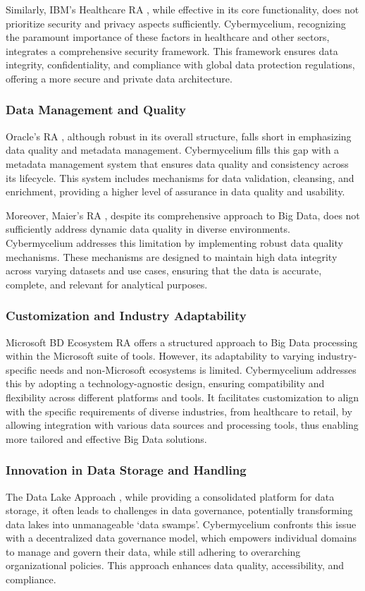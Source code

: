 \documentclass[review]{elsarticle}
\begin{document}
Similarly, IBM's Healthcare RA \cite{quintero2019ibm}, while effective in its core functionality, does not prioritize security and privacy aspects sufficiently. Cybermycelium, recognizing the paramount importance of these factors in healthcare and other sectors, integrates a comprehensive security framework. This framework ensures data integrity, confidentiality, and compliance with global data protection regulations, offering a more secure and private data architecture.

\subsubsection{Data Management and Quality}
Oracle's RA \cite{cackett2013information}, although robust in its overall structure, falls short in emphasizing data quality and metadata management. Cybermycelium fills this gap with a metadata management system that ensures data quality and consistency across its lifecycle. This system includes mechanisms for data validation, cleansing, and enrichment, providing a higher level of assurance in data quality and usability.

Moreover, Maier's RA \cite{Maier}, despite its comprehensive approach to Big Data, does not sufficiently address dynamic data quality in diverse environments. Cybermycelium addresses this limitation by implementing robust data quality mechanisms. These mechanisms are designed to maintain high data integrity across varying datasets and use cases, ensuring that the data is accurate, complete, and relevant for analytical purposes.


\subsubsection{Customization and Industry Adaptability}
Microsoft BD Ecosystem RA \cite{levin2013big} offers a structured approach to Big Data processing within the Microsoft suite of tools. However, its adaptability to varying industry-specific needs and non-Microsoft ecosystems is limited. Cybermycelium addresses this by adopting a technology-agnostic design, ensuring compatibility and flexibility across different platforms and tools. It facilitates customization to align with the specific requirements of diverse industries, from healthcare to retail, by allowing integration with various data sources and processing tools, thus enabling more tailored and effective Big Data solutions.

\subsubsection{Innovation in Data Storage and Handling}
The Data Lake Approach \cite{paakkonen2015reference}, while providing a consolidated platform for data storage, it often leads to challenges in data governance, potentially transforming data lakes into unmanageable `data swamps'. Cybermycelium confronts this issue with a decentralized data governance model, which empowers individual domains to manage and govern their data, while still adhering to overarching organizational policies. This approach enhances data quality, accessibility, and compliance.
\end{document}
